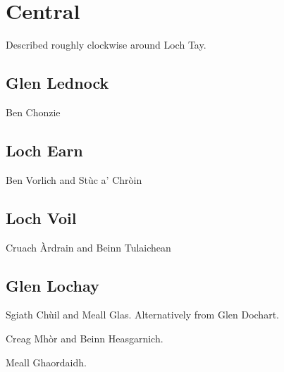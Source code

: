 
\section{Central}

Described roughly clockwise around Loch Tay.


\subsection{Glen Lednock}

\begin{munros}
\item
Ben Chonzie
\end{munros}


\subsection{Loch Earn}

\begin{munros}
\item
Ben Vorlich and Stùc a' Chròin
\end{munros}



\subsection{Loch Voil}

\begin{munros}
\item
Cruach Àrdrain and Beinn Tulaichean
\end{munros}


\subsection{Glen Lochay}

\begin{munros}
\item
Sgiath Chùil and Meall Glas.  Alternatively from Glen Dochart.

\item
Creag Mhòr and Beinn Heasgarnich.

\item
Meall Ghaordaidh.
\end{munros}

